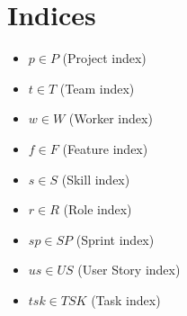 \documentclass{article}
\begin{document}
\section{Indices}
\begin{itemize}
    \item $p \in P$ (Project index)
    \item $t \in T$ (Team index)
    \item $w \in W$ (Worker index)
    \item $f \in F$ (Feature index)
    \item $s \in S$ (Skill index)
    \item $r \in R$ (Role index)
    \item $sp \in SP$ (Sprint index)
    \item $us \in US$ (User Story index)
    \item $tsk \in TSK$ (Task index)
\end{itemize}
\end{document}

